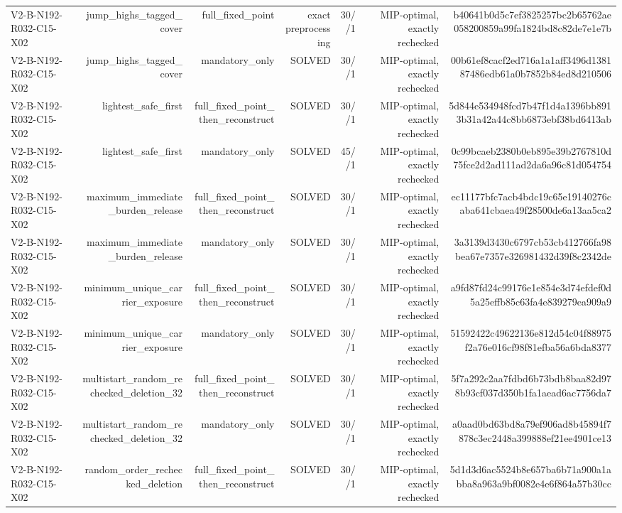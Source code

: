 {\begin{longtable}{lrrrrrr}
V2-B-N192-R032-C15-X02 & jump\_highs\_tagged\_cover & full\_fixed\_point & exact preprocessing & 30//1 & MIP-optimal, exactly rechecked & b40641b0d5c7ef3825257bc2b65762ae058200859a99fa1824bd8c82de7e1e7b \\
V2-B-N192-R032-C15-X02 & jump\_highs\_tagged\_cover & mandatory\_only & SOLVED & 30//1 & MIP-optimal, exactly rechecked & 00b61ef8cacf2ed716a1a1aff3496d138187486edb61a0b7852b84ed8d210506 \\
V2-B-N192-R032-C15-X02 & lightest\_safe\_first & full\_fixed\_point\_then\_reconstruct & SOLVED & 30//1 & MIP-optimal, exactly rechecked & 5d844e534948fcd7b47f1d4a1396bb8913b31a42a44c8bb6873ebf38bd6413ab \\
V2-B-N192-R032-C15-X02 & lightest\_safe\_first & mandatory\_only & SOLVED & 45//1 & MIP-optimal, exactly rechecked & 0c99bcaeb2380b0eb895e39b2767810d75fce2d2ad111ad2da6a96c81d054754 \\
V2-B-N192-R032-C15-X02 & maximum\_immediate\_burden\_release & full\_fixed\_point\_then\_reconstruct & SOLVED & 30//1 & MIP-optimal, exactly rechecked & ec11177bfc7acb4bdc19c65e19140276caba641cbaea49f28500de6a13aa5ca2 \\
V2-B-N192-R032-C15-X02 & maximum\_immediate\_burden\_release & mandatory\_only & SOLVED & 30//1 & MIP-optimal, exactly rechecked & 3a3139d3430c6797cb53cb412766fa98bea67e7357e326981432d39f8c2342de \\
V2-B-N192-R032-C15-X02 & minimum\_unique\_carrier\_exposure & full\_fixed\_point\_then\_reconstruct & SOLVED & 30//1 & MIP-optimal, exactly rechecked & a9fd87fd24c99176e1e854e3d74efdef0d5a25effb85c63fa4e839279ea909a9 \\
V2-B-N192-R032-C15-X02 & minimum\_unique\_carrier\_exposure & mandatory\_only & SOLVED & 30//1 & MIP-optimal, exactly rechecked & 51592422c49622136e812d54c04f88975f2a76e016cf98f81efba56a6bda8377 \\
V2-B-N192-R032-C15-X02 & multistart\_random\_rechecked\_deletion\_32 & full\_fixed\_point\_then\_reconstruct & SOLVED & 30//1 & MIP-optimal, exactly rechecked & 5f7a292c2aa7fdbd6b73bdb8baa82d978b93cf037d350b1fa1aead6ac7756da7 \\
V2-B-N192-R032-C15-X02 & multistart\_random\_rechecked\_deletion\_32 & mandatory\_only & SOLVED & 30//1 & MIP-optimal, exactly rechecked & a0aad0bd63bd8a79ef906ad8b45894f7878c3ec2448a399888ef21ee4901ce13 \\
V2-B-N192-R032-C15-X02 & random\_order\_rechecked\_deletion & full\_fixed\_point\_then\_reconstruct & SOLVED & 30//1 & MIP-optimal, exactly rechecked & 5d1d3d6ac5524b8e657ba6b71a900a1abba8a963a9bf0082e4e6f864a57b30cc \\

\end{longtable}}
